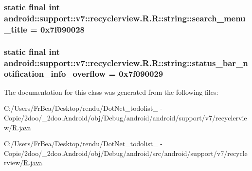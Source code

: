 \hypertarget{classandroid_1_1support_1_1v7_1_1recyclerview_1_1_r_1_1string_b47266b6b803270932773dcde0de66f5}{
\subsubsection[{search\_\-menu\_\-title}]{\setlength{\rightskip}{0pt plus 5cm}static final int android::support::v7::recyclerview.R.R::string::search\_\-menu\_\-title = 0x7f090028}}
\label{classandroid_1_1support_1_1v7_1_1recyclerview_1_1_r_1_1string_b47266b6b803270932773dcde0de66f5}


\hypertarget{classandroid_1_1support_1_1v7_1_1recyclerview_1_1_r_1_1string_ce50ee966a2878f868aabcba68af90b3}{
\subsubsection[{status\_\-bar\_\-notification\_\-info\_\-overflow}]{\setlength{\rightskip}{0pt plus 5cm}static final int android::support::v7::recyclerview.R.R::string::status\_\-bar\_\-notification\_\-info\_\-overflow = 0x7f090029}}
\label{classandroid_1_1support_1_1v7_1_1recyclerview_1_1_r_1_1string_ce50ee966a2878f868aabcba68af90b3}




The documentation for this class was generated from the following files:\begin{CompactItemize}
\item 
C:/Users/FrBea/Desktop/rendu/DotNet\_\-todolist\_ - Copie/2doo/\_\-2doo.Android/obj/Debug/android/android/support/v7/recyclerview/\hyperlink{android_2support_2v7_2recyclerview_2_r_8java}{R.java}\item 
C:/Users/FrBea/Desktop/rendu/DotNet\_\-todolist\_ - Copie/2doo/\_\-2doo.Android/obj/Debug/android/src/android/support/v7/recyclerview/\hyperlink{src_2android_2support_2v7_2recyclerview_2_r_8java}{R.java}\end{CompactItemize}
